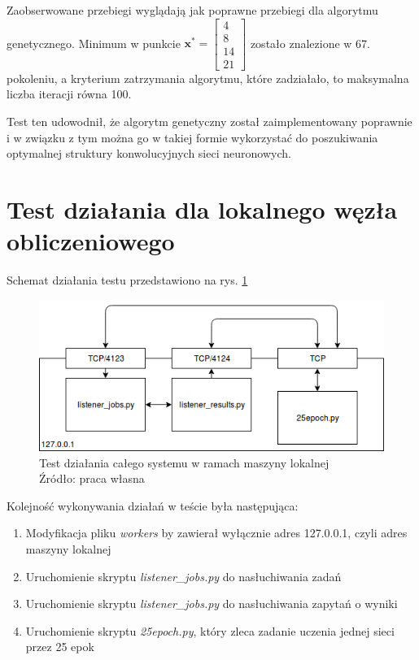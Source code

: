 Zaobserwowane przebiegi wyglądają jak poprawne przebiegi dla algorytmu genetycznego.
Minimum w punkcie $\mathbf{x^*} = \begin{bmatrix}4 \\ 8 \\ 14 \\ 21\end{bmatrix}$ zostało znalezione w 67. pokoleniu, a kryterium zatrzymania algorytmu, które zadziałało, to maksymalna liczba iteracji równa 100.

Test ten udowodnił, że algorytm genetyczny został zaimplementowany poprawnie i w związku z tym można go w takiej formie wykorzystać do poszukiwania optymalnej struktury konwolucyjnych sieci neuronowych.

\section{Test działania dla lokalnego węzła obliczeniowego}

Schemat działania testu przedstawiono na rys. \ref{fig:localhost_test}

\begin{figure}[h!tb]
	 \centering
	 \includegraphics[width = 1.0\linewidth]{img/localhost_test}
	 \caption{Test działania całego systemu w ramach maszyny lokalnej\\
              Źródło: praca własna}
	 \label{fig:localhost_test}
\end{figure}

Kolejność wykonywania działań w teście była następująca:

\begin{enumerate}
  \item Modyfikacja pliku \textit{workers} by zawierał wyłącznie adres 127.0.0.1, czyli adres maszyny lokalnej
  \item Uruchomienie skryptu \textit{listener\_jobs.py} do nasłuchiwania zadań
  \item Uruchomienie skryptu \textit{listener\_jobs.py} do nasłuchiwania zapytań o wyniki
  \item Uruchomienie skryptu \textit{25epoch.py}, który zleca zadanie uczenia jednej sieci przez 25 epok
\end{enumerate}

